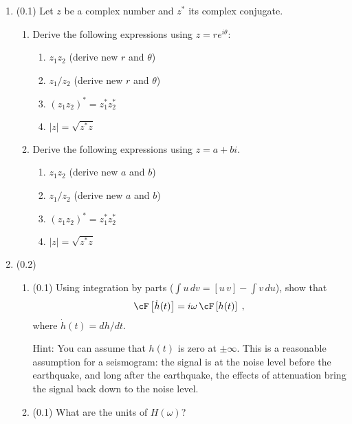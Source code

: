 \documentclass[11pt,titlepage,fleqn]{article}
\newcommand{\fft}{h}
\newcommand{\ffw}{H}
\begin{document}
\begin{enumerate}

\item (0.1) Let $z$ be a complex number and $z^*$ its complex conjugate.

\begin{enumerate}

\item Derive the following expressions using $z = r e^{i\theta}$:
%
\begin{enumerate}
\item $z_1 z_2$ (derive new $r$ and $\theta$)
\item $z_1 / z_2$ (derive new $r$ and $\theta$)
\item $(z_1 z_2)^* = z_1^* z_2^*$
\item $|z| = \sqrt{z^* z}$
\end{enumerate}

\item Derive the following expressions using $z = a+bi$.
%
\begin{enumerate}
\item $z_1 z_2$ (derive new $a$ and $b$)
\item $z_1 / z_2$ (derive new $a$ and $b$)
\item $(z_1 z_2)^* = z_1^* z_2^*$
\item $|z| = \sqrt{z^* z}$
\end{enumerate}

\end{enumerate}


\item (0.2) \ptag\ 

\begin{enumerate}
\item (0.1) Using integration by parts ($\int u\,dv = [u\,v] - \int v\,du$), show that 
%
\begin{eqnarray}
\cF \left[ \dot{\fft}(t) \right] = i\omega \, \cF \left[ \fft(t) \right]
\label{fftder1}
\;,
\end{eqnarray}
%
where $\dot{\fft}(t) = d\fft/dt$.

Hint: You can assume that $h(t)$ is zero at $\pm\infty$. This is a reasonable assumption for a seismogram: the signal is at the noise level before the earthquake, and long after the earthquake, the effects of attenuation bring the signal back down to the noise level.

\item (0.1) What are the units of $\ffw(\omega)$?
\end{enumerate}


\end{enumerate}
\end{document}
